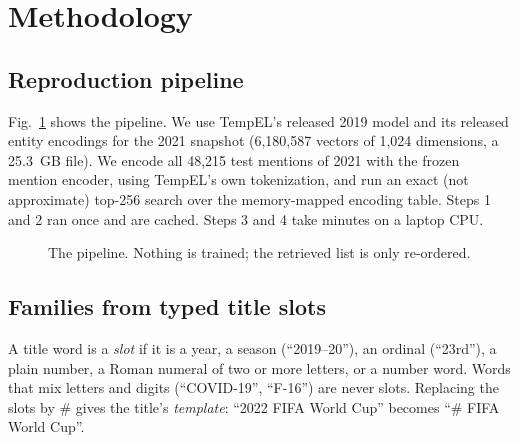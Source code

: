 \documentclass[conference]{IEEEtran}
\begin{document}
\section{Methodology}

\subsection{Reproduction pipeline}

Fig.~\ref{fig:pipe} shows the pipeline. We use TempEL's released 2019 model and its released entity
encodings for the 2021 snapshot (6,180,587 vectors of 1,024 dimensions, a 25.3~GB file). We encode all
48,215 test mentions of 2021 with the frozen mention encoder, using TempEL's own tokenization, and run
an exact (not approximate) top-256 search over the memory-mapped encoding table. Steps 1 and 2 ran
once and are cached. Steps 3 and 4 take minutes on a laptop CPU.

\begin{figure}[t]
\centering
{}
\caption{The pipeline. Nothing is trained; the retrieved list is only re-ordered.}
\label{fig:pipe}
\end{figure}

\subsection{Families from typed title slots}

A title word is a \emph{slot} if it is a year, a season (``2019--20''), an ordinal (``23rd''), a plain
number, a Roman numeral of two or more letters, or a number word. Words that mix letters and digits
(``COVID-19'', ``F-16'') are never slots. Replacing the slots by \# gives the title's \emph{template}:
``2022 FIFA World Cup'' becomes ``\# FIFA World Cup''.
\end{document}
